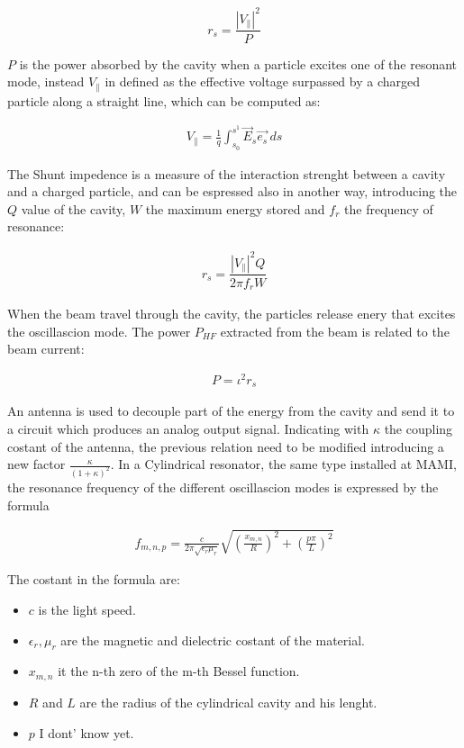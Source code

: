 \begin{equation}
r_{s} = \frac{|V_{\|}|^{2}}{P}
\end{equation}

$P$ is the power absorbed by the cavity when a particle excites one of the resonant mode, instead $V_{\|}$ in defined as the effective voltage surpassed by a charged particle along a straight line, which can be computed as:

\begin{align*}
V_{\|} = \frac{1}{q}  \int_{s_{0}}^{s^{1}} \vec{E}_{s} \vec{e_{s}} \,ds
\end{align*}

The Shunt impedence is a measure of the interaction strenght between a cavity and a charged particle, and can be espressed also in another way, introducing the $Q$ value of the cavity, $W$ the maximum energy stored and $f_{r}$ the frequency of resonance:

\begin{align*}
r_{s} = \dfrac{|V_{\|}|^{2} Q}{2 \pi f_{r} W}
\end{align*}

When the beam travel through the cavity, the particles release enery that excites the oscillascion mode. The power $P_{HF}$ extracted from the beam is related to the beam current: 

\begin{align*}
P = \iota^{2} r_{s}
\end{align*}

An antenna is used to decouple part of the energy from the cavity and send it to a circuit which produces an analog output signal. Indicating with $\kappa$ the coupling costant of the antenna, the previous relation need to be modified introducing a new factor $ \frac{\kappa}{(1 + \kappa)^2}$. In a Cylindrical resonator, the same type installed at MAMI, the resonance frequency of the different oscillascion modes is expressed by the formula 

\begin{align*}
f_{m,n,p} = \frac{c}{2\pi \sqrt{\epsilon_{r} \mu_{r}}} \sqrt{(\frac{x_{m,n}}{R})^{2} + (\frac{p \pi}{L})^{2}}
\end{align*}

The costant in the formula are:

\begin{itemize}
\item $c$ is the light speed.
\item $\epsilon_{r}, \mu_{r}$ are the magnetic and dielectric costant of the material.
\item $x_{m,n}$ it the n-th zero of the m-th Bessel function.
\item $R$ and $L$ are the radius of the cylindrical cavity and his lenght.
\item $p$ I dont' know yet.
\end{itemize}

